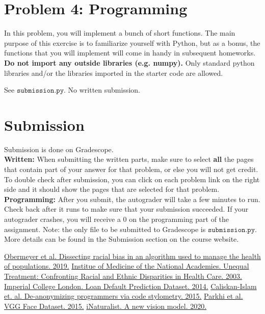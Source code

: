 \documentclass{article}
\theoremstyle{case}
\theoremstyle{definition}
\begin{document}
\newpage
\section*{Problem 4: Programming}

In this problem, you will implement a bunch of short functions. The main
purpose of this exercise is to familiarize yourself with Python,
but as a bonus, the functions that you will implement will come in handy in
subsequent homeworks. \\

\textbf{Do not import any outside libraries (e.g. numpy).} Only standard python
libraries and/or the libraries imported in the starter code are allowed.

\begin{shaded}
See $\texttt{submission.py}$. No written submission.
\end{shaded}


\section*{Submission}
Submission is done on Gradescope. \\

\textbf{Written:} When submitting the written parts, make sure to select \textbf{all} the pages that contain part of your answer for that problem, or else you will not get credit.
To double check after submission, you can click on each problem link on the right side and it should show the pages that are selected for that problem. \\

\textbf{Programming:} After you submit, the autograder will take a few minutes to run. Check back after it runs to make sure that your submission succeeded. If your autograder crashes, you will receive a 0 on the programming part of the assignment. Note: the only file to be submitted to Gradescope is $\texttt{submission.py}$.\\

More details can be found in the Submission section on the course website.


\newpage

\begin{thebibliography}{9}
\href{https://doi.org/10.1126/science.aax2342}{Obermeyer et al. Dissecting racial bias in an algorithm used to manage the health of populations. 2019.}
\href{https://www.nap.edu/catalog/10260/unequal-treatment-confronting-racial-and-ethnic-disparities-in-health-care}{Institue of Medicine of the National Academies. Unequal Treatment: Confronting Racial and Ethnic Disparities in Health Care. 2003.}
\href{https://www.kaggle.com/c/loan-default-prediction/data}{Imperial College London. Loan Default Prediction Dataset. 2014.}
\href{https://dl.acm.org/doi/10.5555/2831143.2831160}{Caliskan-Islam et. al. De-anonymizing programmers via code stylometry. 2015.}
\href{https://www.robots.ox.ac.uk/~vgg/data/vgg_face/}{Parkhi et al. VGG Face Dataset. 2015.}
\href{https://www.inaturalist.org/blog/31806-a-new-vision-model}{iNaturalist. A new vision model. 2020.}
\end{thebibliography}
\end{document}
